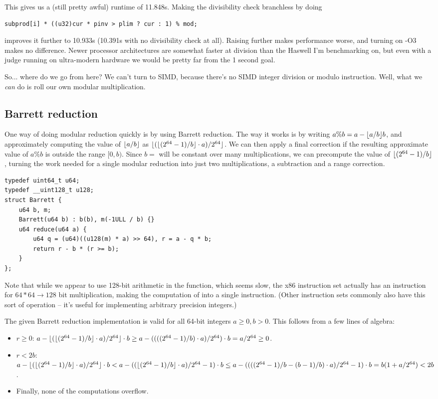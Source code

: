 This gives us a (still pretty awful) runtime of 11.848s.
Making the divisibility check branchless by doing
\begin{lstlisting}
subprod[i] * ((u32)cur * pinv > plim ? cur : 1) % mod;
\end{lstlisting}
improves it further to 10.933s (10.391s with no divisibility check at all).
Raising \verb@PAR@ further makes performance worse, and turning on -O3 makes no difference.
Newer processor architectures are somewhat faster at division than the Haswell I'm benchmarking on, but even with a judge running on ultra-modern hardware we would be pretty far from the 1 second goal.

So... where do we go from here?
We can't turn to SIMD, because there's no SIMD integer division or modulo instruction.
Well, what we \emph{can} do is roll our own modular multiplication.

\subsection{Barrett reduction}
One way of doing modular reduction quickly is by using Barrett reduction.
The way it works is by writing $a \% b = a - \lfloor a / b\rfloor b$, and approximately computing the value of $\lfloor a / b\rfloor$ as $\lfloor(\lfloor(2^{64} - 1) / b\rfloor \cdot a) / 2^{64}\rfloor$.
We can then apply a final correction if the resulting approximate value of $a \% b$ is outside the range $[0, b)$.
Since $b =$ \verb@mod@ will be constant over many multiplications, we can precompute the value of $\lfloor(2^{64} - 1) / b\rfloor$, turning the work needed for a single modular reduction into just two multiplications, a subtraction and a range correction.
\begin{lstlisting}
typedef uint64_t u64;
typedef __uint128_t u128;
struct Barrett {
	u64 b, m;
	Barrett(u64 b) : b(b), m(-1ULL / b) {}
	u64 reduce(u64 a) {
		u64 q = (u64)((u128(m) * a) >> 64), r = a - q * b;
		return r - b * (r >= b);
	}
};
\end{lstlisting}

Note that while we appear to use 128-bit arithmetic in the \verb@reduce@ function, which seems slow, the x86 instruction set actually has an instruction for \mbox{$64*64\rightarrow128$} bit multiplication, making the computation of \verb@q@ into a single instruction.
(Other instruction sets commonly also have this sort of operation -- it's useful for implementing arbitrary precision integers.)

The given Barrett reduction implementation is valid for all 64-bit integers $a \ge 0, b > 0$. This follows from a few lines of algebra:
\begin{itemize}
\item $r \ge 0$: $a - \lfloor(\lfloor (2^{64} - 1) / b\rfloor \cdot a)/2^{64}\rfloor \cdot b \ge a - ((((2^{64} - 1) / b) \cdot a)/2^{64}) \cdot b = a / 2^{64} \ge 0$.
\item $r < 2b$: $a - \lfloor(\lfloor (2^{64} - 1) / b\rfloor \cdot a)/2^{64}\rfloor \cdot b < a - ((\lfloor (2^{64} - 1) / b\rfloor \cdot a)/2^{64} - 1) \cdot b \le a - ((((2^{64} - 1) / b - (b - 1) / b) \cdot a)/2^{64} - 1) \cdot b = b (1 + a/2^{64}) < 2b$.
\item Finally, none of the computations overflow.
\end{itemize}

